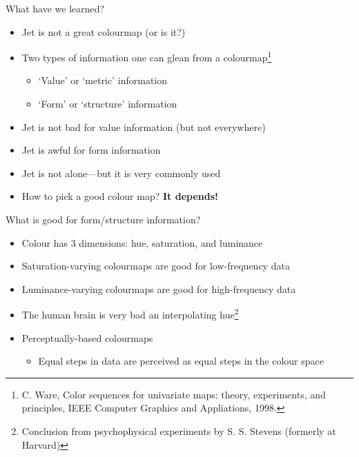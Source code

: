 \documentclass[10pt,presentation,compress]{beamer}
\begin{document}
\begin{frame}{What have we learned?}
  \begin{itemize}
    \item Jet is not a great colourmap (or is it?)
    \item Two types of information one can glean from a colourmap\footnote{C.
      Ware, Color sequences for univariate maps: theory, experiments, and
      principles, IEEE Computer Graphics and Appliations, 1998.}
      \begin{itemize}
        \item `Value' or `metric' information
        \item `Form' or `structure' information
      \end{itemize}
    \item Jet is not bad for value information (but not everywhere)
    \item Jet is awful for form information
    \item Jet is not alone---but it is very commonly used
    \item How to pick a good colour map?  \textbf{It depends!}
  \end{itemize}
\end{frame}

\begin{frame}{What is good for form/structure information?}
  \begin{itemize}
    \item Colour has 3 dimensions: hue, saturation, and luminance
    \item Saturation-varying colourmaps are good for low-frequency data
    \item Luminance-varying colourmaps are good for high-frequency data
    \item The human brain is very bad an interpolating hue\footnote{Conclusion
      from psychophysical experiments by S. S. Stevens (formerly at Harvard)}
    \item Perceptually-based colourmaps
      \begin{itemize}
        \item Equal steps in data are perceived as equal steps in the colour
          space
      \end{itemize}
  \end{itemize}
\end{frame}
\end{document}
